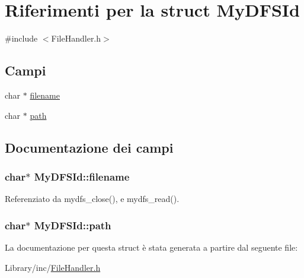 \hypertarget{structMyDFSId}{}\section{Riferimenti per la struct My\+D\+F\+S\+Id}
\label{structMyDFSId}


{\ttfamily \#include $<$File\+Handler.\+h$>$}

\subsection*{Campi}
\begin{DoxyCompactItemize}
\item 
char $\ast$ \hyperlink{structMyDFSId_ac0e1b8c96d859982c1a7d49f9e929e48}{filename}
\item 
char $\ast$ \hyperlink{structMyDFSId_ada22c15c99f564f9bfbe95d0d28913c2}{path}
\end{DoxyCompactItemize}


\subsection{Documentazione dei campi}
\hypertarget{structMyDFSId_ac0e1b8c96d859982c1a7d49f9e929e48}{}
\subsubsection[{filename}]{\setlength{\rightskip}{0pt plus 5cm}char$\ast$ My\+D\+F\+S\+Id\+::filename}\label{structMyDFSId_ac0e1b8c96d859982c1a7d49f9e929e48}


Referenziato da mydfs\+\_\+close(), e mydfs\+\_\+read().

\hypertarget{structMyDFSId_ada22c15c99f564f9bfbe95d0d28913c2}{}
\subsubsection[{path}]{\setlength{\rightskip}{0pt plus 5cm}char$\ast$ My\+D\+F\+S\+Id\+::path}\label{structMyDFSId_ada22c15c99f564f9bfbe95d0d28913c2}


La documentazione per questa struct è stata generata a partire dal seguente file\+:\begin{DoxyCompactItemize}
\item 
Library/inc/\hyperlink{FileHandler_8h}{File\+Handler.\+h}\end{DoxyCompactItemize}
